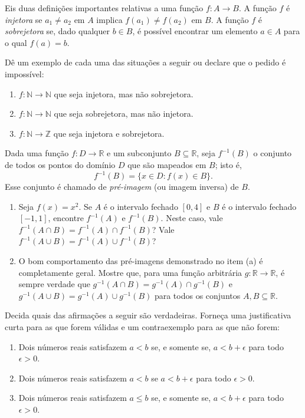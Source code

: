 \begin{exercise}\label{ex:injetora-sobrejetora}
Eis duas definições importantes relativas a uma função $f \colon A \to B$. A função $f$ é \textit{injetora} se $a_{1} \neq a_{2}$ em $A$ implica $f(a_{1}) \neq f(a_{2})$ em $B$. A função $f$ é \textit{sobrejetora} se, dado qualquer $b \in B$, é possível encontrar um elemento $a \in A$ para o qual $f(a) = b$.  

Dê um exemplo de cada uma das situações a seguir ou declare que o pedido é impossível:
\begin{enumerate}[label=\alph*)]
\item $f \colon \mathbb{N} \to \mathbb{N}$ que seja injetora, mas não sobrejetora.
\item $f \colon \mathbb{N} \to \mathbb{N}$ que seja sobrejetora, mas não injetora.
\item $f \colon \mathbb{N} \to \mathbb{Z}$ que seja injetora e sobrejetora.
\end{enumerate}
\end{exercise}

\begin{exercise}\label{ex:pre-imagem}
Dada uma função $f \colon D \to \mathbb{R}$ e um subconjunto $B \subseteq \mathbb{R}$, seja $f^{-1}(B)$ o conjunto de todos os pontos do domínio $D$ que são mapeados em $B$; isto é, 
$$f^{-1}(B) = \{x \in D : f(x) \in B\}.$$ 
Esse conjunto é chamado de \textit{pré-imagem} (ou imagem inversa) de $B$. 
\begin{enumerate}[label=\alph*)]
\item Seja $f(x) = x^{2}$. Se $A$ é o intervalo fechado $[0, 4]$ e $B$ é o intervalo fechado $[-1, 1]$, encontre $f^{-1}(A)$ e $f^{-1}(B)$. Neste caso, vale $f^{-1}(A \cap B) = f^{-1}(A) \cap f^{-1}(B)$? Vale $f^{-1}(A \cup B) = f^{-1}(A) \cup f^{-1}(B)$?
\item O bom comportamento das pré-imagens demonstrado no item (a) é completamente geral. Mostre que, para uma função arbitrária $g \colon \mathbb{R} \to \mathbb{R}$, é sempre verdade que $g^{-1}(A \cap B) = g^{-1}(A) \cap g^{-1}(B)$ e $g^{-1}(A \cup B) = g^{-1}(A) \cup g^{-1}(B)$ para todos os conjuntos $A, B \subseteq \mathbb{R}$.
\end{enumerate}
\end{exercise}

\begin{exercise}\label{ex:epsilon-desigualdades}
Decida quais das afirmações a seguir são verdadeiras. Forneça uma justificativa curta para as que forem válidas e um contraexemplo para as que não forem:
\begin{enumerate}[label=\alph*)]
\item Dois números reais satisfazem $a < b$ se, e somente se, $a < b + \epsilon$ para todo $\epsilon > 0$.
\item Dois números reais satisfazem $a < b$ se $a < b + \epsilon$ para todo $\epsilon > 0$.
\item Dois números reais satisfazem $a \leq b$ se, e somente se, $a < b + \epsilon$ para todo $\epsilon > 0$.
\end{enumerate}
\end{exercise}

